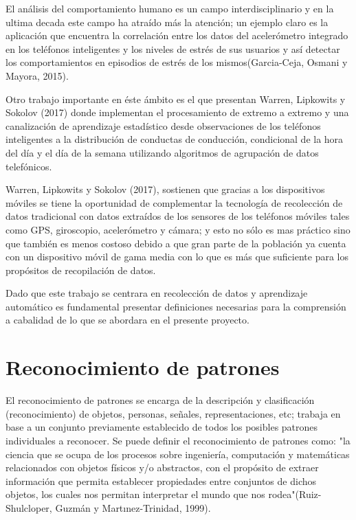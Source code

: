 
El análisis del comportamiento humano es un campo interdisciplinario y en la ultima decada este campo ha atraído más la atención; un ejemplo claro es la aplicación que encuentra la correlación entre los datos del acelerómetro integrado en los teléfonos inteligentes y los niveles de estrés de sus usuarios y así detectar los comportamientos en episodios de estrés de los mismos(Garcia-Ceja, Osmani y Mayora, 2015).

Otro trabajo importante en éste ámbito es el que presentan Warren, Lipkowits y Sokolov (2017) donde implementan el procesamiento de extremo a extremo y una canalización de aprendizaje estadístico desde observaciones de los teléfonos inteligentes a la distribución de conductas de conducción, condicional de la hora del día y el día de la semana utilizando algoritmos de agrupación de datos telefónicos.

Warren, Lipkowits y Sokolov (2017), sostienen que gracias a los dispositivos móviles se tiene la oportunidad de complementar  la tecnología de recolección de datos tradicional con datos extraídos de los sensores de los teléfonos móviles tales como GPS, giroscopio, acelerómetro y cámara; y esto no sólo es mas práctico sino que también es menos costoso debido a que gran parte de la población ya cuenta con un dispositivo móvil de gama media con lo que es más que suficiente para los propósitos de recopilación de datos.

Dado que este trabajo se centrara en recolección de datos y aprendizaje automático es fundamental presentar definiciones necesarias para la comprensión a cabalidad de lo que se abordara en el presente proyecto.

\section{Reconocimiento de patrones}
El reconocimiento de patrones se encarga de la descripción y clasificación (reconocimiento) de objetos, personas, señales, representaciones, etc; trabaja en base a un conjunto previamente establecido de todos los posibles patrones individuales a reconocer.
Se puede definir el reconocimiento de patrones como: "la ciencia que se ocupa de los procesos sobre ingeniería, computación y matemáticas relacionados con objetos físicos y/o abstractos, con el propósito de extraer información que permita establecer propiedades entre conjuntos de dichos objetos, los cuales nos permitan interpretar el mundo que nos rodea"(Ruiz-Shulcloper, Guzmán y Martınez-Trinidad, 1999).

